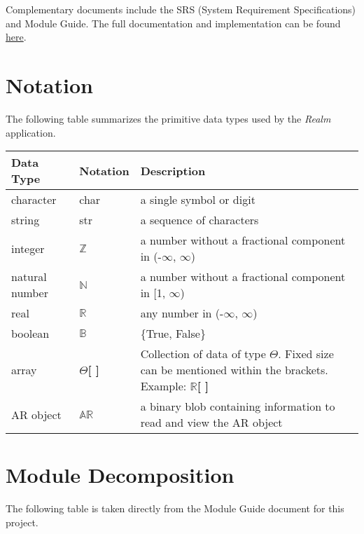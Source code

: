 \documentclass[12pt, titlepage]{article}
\begin{document}
Complementary documents include the SRS (System Requirement Specifications) and Module Guide. The full documentation and implementation can be found \href{https://github.com/russellrd/realm}{here}.

\section{Notation}

The following table summarizes the primitive data types used by the \textit{Realm} application.

\begin{center}
  \renewcommand{\arraystretch}{1.2}
  \noindent
  \begin{tabular}{l l p{7.5cm}}
    \toprule
    \textbf{Data Type} & \textbf{Notation} & \textbf{Description}\\
    \midrule
    character & char & a single symbol or digit\\
    string & str & a sequence of characters\\
    integer & $\mathbb{Z}$ & a number without a fractional component in (-$\infty$, $\infty$) \\
    natural number & $\mathbb{N}$ & a number without a fractional component in [1, $\infty$) \\
    real & $\mathbb{R}$ & any number in (-$\infty$, $\infty$)\\
    boolean & $\mathbb{B}$ & \{True, False\} \\
    array & $\Theta$\textbf{[ ]} & Collection of data of type $\Theta$. Fixed size can be mentioned within the brackets.  Example: $\mathbb{R}$\textbf{[ ]}\\
    AR object & $\mathbb{AR}$ & a binary blob containing information to read and view the AR object \\
    \bottomrule
  \end{tabular}
\end{center}

\newpage

\section{Module Decomposition}

The following table is taken directly from the Module Guide document for this project.
\end{document}

